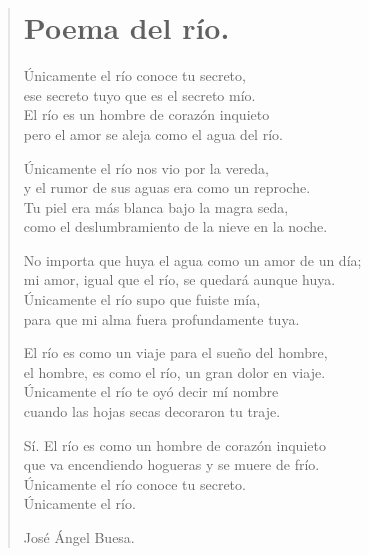 \documentclass[11pt, portrait, twoside, notitlepage, openright]{book}
\begin{document}
\newpage
\begin{verse}
\begin{center}
\section{Poema del río.}
\end{center}
Únicamente el río conoce tu secreto,\\
ese secreto tuyo que es el secreto mío.\\
El río es un hombre de corazón inquieto\\
pero el amor se aleja como el agua del río.
\newline

Únicamente el río nos vio por la vereda,\\
y el rumor de sus aguas era como un reproche.\\
Tu piel era más blanca bajo la magra seda,\\
como el deslumbramiento de la nieve en la noche.
\newline

No importa que huya el agua como un amor de un día;\\
mi amor, igual que el río, se quedará aunque huya.\\
Únicamente el río supo que fuiste mía,\\
para que mi alma fuera profundamente tuya.
\newline

El río es como un viaje para el sueño del hombre,\\
el hombre, es como el río, un gran dolor en viaje.\\
Únicamente el río te oyó decir mí nombre\\
cuando las hojas secas decoraron tu traje.
\newpage

Sí. El río es como un hombre de corazón inquieto\\
que va encendiendo hogueras y se muere de frío.\\
Únicamente el río conoce tu secreto.\\
Únicamente el río.
\newline

José Ángel Buesa.
\end{verse}
\end{document}
